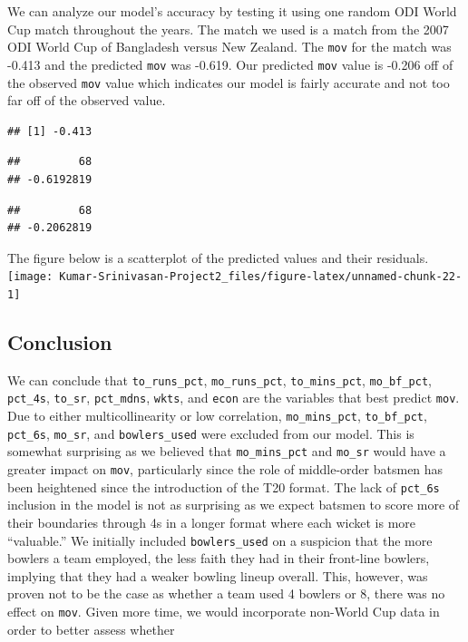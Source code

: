 \documentclass[
]{article}
\begin{document}
We can analyze our model's accuracy by testing it using one random ODI
World Cup match throughout the years. The match we used is a match from
the 2007 ODI World Cup of Bangladesh versus New Zealand. The
\texttt{mov} for the match was -0.413 and the predicted \texttt{mov} was
-0.619. Our predicted \texttt{mov} value is -0.206 off of the observed
\texttt{mov} value which indicates our model is fairly accurate and not
too far off of the observed value.

\begin{verbatim}
## [1] -0.413
\end{verbatim}

\begin{verbatim}
##         68 
## -0.6192819
\end{verbatim}

\begin{verbatim}
##         68 
## -0.2062819
\end{verbatim}

The figure below is a scatterplot of the predicted values and their
residuals.\\

\texttt{[image: Kumar-Srinivasan-Project2\_files/figure-latex/unnamed-chunk-22-1]}

\hypertarget{conclusion}{%
\subsection{Conclusion}\label{conclusion}}

We can conclude that \texttt{to\_runs\_pct}, \texttt{mo\_runs\_pct},
\texttt{to\_mins\_pct}, \texttt{mo\_bf\_pct}, \texttt{pct\_4s},
\texttt{to\_sr}, \texttt{pct\_mdns}, \texttt{wkts}, and \texttt{econ}
are the variables that best predict \texttt{mov}. Due to either
multicollinearity or low correlation, \texttt{mo\_mins\_pct},
\texttt{to\_bf\_pct}, \texttt{pct\_6s}, \texttt{mo\_sr}, and
\texttt{bowlers\_used} were excluded from our model. This is somewhat
surprising as we believed that \texttt{mo\_mins\_pct} and
\texttt{mo\_sr} would have a greater impact on \texttt{mov},
particularly since the role of middle-order batsmen has been heightened
since the introduction of the T20 format. The lack of \texttt{pct\_6s}
inclusion in the model is not as surprising as we expect batsmen to
score more of their boundaries through 4s in a longer format where each
wicket is more ``valuable.'' We initially included
\texttt{bowlers\_used} on a suspicion that the more bowlers a team
employed, the less faith they had in their front-line bowlers, implying
that they had a weaker bowling lineup overall. This, however, was proven
not to be the case as whether a team used 4 bowlers or 8, there was no
effect on \texttt{mov}. Given more time, we would incorporate non-World
Cup data in order to better assess whether
\end{document}
